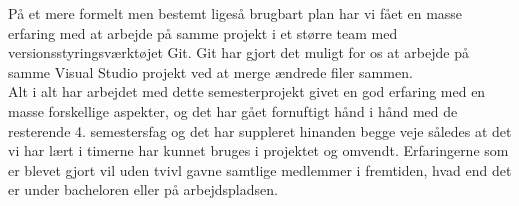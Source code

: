 På et mere formelt men bestemt ligeså brugbart plan har vi fået en masse erfaring med at arbejde på samme projekt i et større team med versionsstyringsværktøjet Git. Git har gjort det muligt for os at arbejde på samme Visual Studio projekt ved at merge ændrede filer sammen. \\

Alt i alt har arbejdet med dette semesterprojekt givet en god erfaring med en masse forskellige aspekter, og det har gået fornuftigt hånd i hånd med de resterende 4. semestersfag og det har suppleret hinanden begge veje således at det vi har lært i timerne har kunnet bruges i projektet og omvendt. Erfaringerne som er blevet gjort vil uden tvivl gavne samtlige medlemmer i fremtiden, hvad end det er under bacheloren eller på arbejdspladsen.








